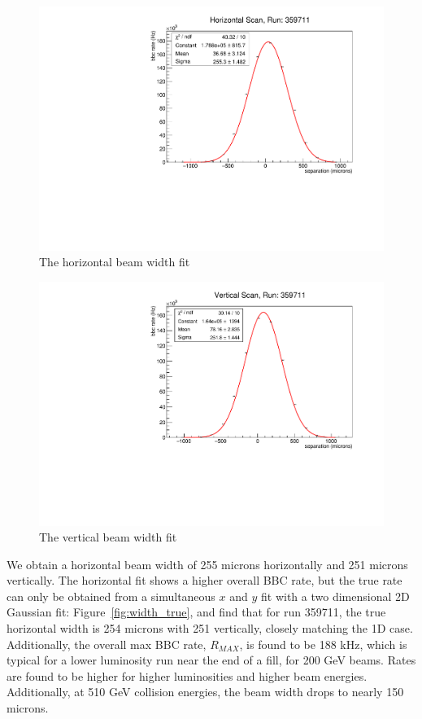 \begin{figure}[ht]
  \centering
  \includegraphics[width=0.7\linewidth]{./figures/h_width_359711.pdf}
  \caption{
    The horizontal beam width fit
  }
  \label{fig:beam_width_h_359711}
\end{figure}
\begin{figure}[ht]
  \centering
  \includegraphics[width=0.7\linewidth]{./figures/v_width_359711.pdf}
  \caption{
    The vertical beam width fit
  }
  \label{fig:beam_width_v_359711}
\end{figure}
\clearpage

We obtain a horizontal beam width of 255 microns horizontally and 251 microns
vertically. The horizontal fit shows a higher overall BBC rate, but the true
rate can only be obtained from a simultaneous $x$ and $y$ fit with a two
dimensional 2D Gaussian fit: Figure~\ref{fig:width_true}, and find that for run
359711, the true horizontal width is 254 microns with 251 vertically, closely
matching the 1D case. Additionally, the overall max BBC rate, $R_{MAX}$, is
found to be 188 kHz, which is typical for a lower luminosity run near the end of
a fill, for 200 GeV beams. Rates are found to be higher for higher luminosities
and higher beam energies. Additionally, at 510 GeV collision energies, the beam
width drops to nearly 150 microns.

